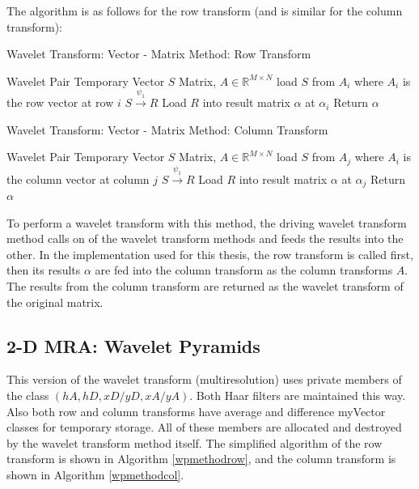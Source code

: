 The algorithm is as follows for the row transform (and is similar for the column transform):  

\begin{algorithm}
\caption{Wavelet Transform: Vector - Matrix Method: Row Transform }
\label{vmmethodrow}
\begin{algorithmic}
\REQUIRE  Wavelet Pair
\REQUIRE Temporary Vector $S$
\REQUIRE Matrix, $A \in {\mathbb R}^{M\times N}$
\STATE load $S$ from $A_i$ where $A_i$ is the row vector at row $i$
\STATE $S \stackrel{\psi_1}{\to} R$
\STATE Load $R$ into result matrix $\alpha$ at $\alpha_i$
\ENDFOR
\STATE Return $\alpha$
\end{algorithmic}
\end{algorithm}

\begin{algorithm}
\caption{Wavelet Transform: Vector - Matrix Method: Column Transform }
\label{vmmethodcol}
\begin{algorithmic}
\REQUIRE  Wavelet Pair
\REQUIRE Temporary Vector $S$
\REQUIRE Matrix, $A \in {\mathbb R}^{M\times N}$
\STATE load $S$ from $A_j$ where $A_i$ is the column vector at column $j$
\STATE $S \stackrel{\psi_1}{\to} R$
\STATE Load $R$ into result matrix $\alpha$ at $\alpha_j$
\ENDFOR
\STATE Return $\alpha$
\end{algorithmic}
\end{algorithm}

To perform a wavelet transform with this method, the driving wavelet transform method calls on of the wavelet transform methods and feeds the results into the other.  In the implementation used for this thesis, the row transform is called first,  then its results $\alpha$ are fed into the column transform as the column transforms $A$.  The results from the column transform are returned as the wavelet transform of the original matrix.  


\subsection{2-D MRA: Wavelet Pyramids}

This version of the wavelet transform (multiresolution) uses private members of the class $(hA, hD, xD/yD, xA/yA)$.  Both Haar filters are maintained this way.  Also both row and column transforms have average and difference myVector classes for temporary storage.   All of these members are allocated and destroyed by the wavelet transform method itself.   The simplified algorithm of the row transform is shown in Algorithm \ref{wpmethodrow}, and the column transform is shown in Algorithm \ref{wpmethodcol}.

